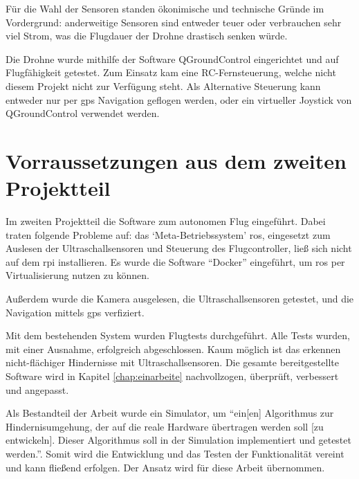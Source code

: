 Für die Wahl der Sensoren standen ökonimische und technische Gründe im Vordergrund: anderweitige Sensoren sind entweder teuer oder verbrauchen sehr viel Strom, was die Flugdauer der Drohne drastisch senken würde\cite[Kapitel 4.3.8]{wirthErweiterungBestehendenDrohne2022}.

Die Drohne wurde mithilfe der Software QGroundControl eingerichtet\cite[Kapitel 4.3.5]{wirthErweiterungBestehendenDrohne2022} und auf Flugfähigkeit getestet\cite[Kapitel 4.3.7]{wirthErweiterungBestehendenDrohne2022}. Zum Einsatz kam eine RC-Fernsteuerung, welche nicht diesem Projekt nicht zur Verfügung steht. Als Alternative Steuerung kann entweder nur per \gls{gps} Navigation geflogen werden, oder ein virtueller Joystick von QGroundControl verwendet werden.

\section{Vorraussetzungen aus dem zweiten Projektteil}
Im zweiten Projektteil \cite{wirthErweiterungBestehendenDrohne2022a} die Software zum autonomen Flug eingeführt. Dabei traten folgende Probleme auf: das \enquote*{Meta-Betriebssystem} \gls{ros}, eingesetzt zum Auslesen der Ultraschallsensoren und Steuerung des Flugcontroller, ließ sich nicht auf dem \gls{rpi} installieren. Es wurde die Software \enquote{Docker} eingeführt, um \gls{ros} per Virtualisierung nutzen zu können\cite[Kapitel 6.5]{wirthErweiterungBestehendenDrohne2022a}.

Außerdem wurde die Kamera\cite[Kapitel 6.8]{wirthErweiterungBestehendenDrohne2022a} ausgelesen, die Ultraschallsensoren getestet\cite[Kapitel 6.9]{wirthErweiterungBestehendenDrohne2022a}, und die Navigation mittels \gls{gps} verfiziert\cite[Kapitel 6.10]{wirthErweiterungBestehendenDrohne2022a}.

Mit dem bestehenden System wurden Flugtests durchgeführt. Alle Tests wurden, mit einer Ausnahme, erfolgreich abgeschlossen. Kaum möglich ist das erkennen nicht-flächiger Hindernisse mit Ultraschallsensoren\cite[Kapitel 6.10]{wirthErweiterungBestehendenDrohne2022a}. Die gesamte bereitgestellte Software wird in Kapitel \cref{chap:einarbeite} nachvollzogen, überprüft, verbessert und angepasst.

Als Bestandteil der Arbeit wurde ein Simulator, um \enquote{ein[en] Algorithmus zur Hindernisumgehung, der auf die reale Hardware übertragen werden soll [zu entwickeln]. Dieser Algorithmus soll in der Simulation implementiert und getestet werden.}\cite[Kapitel 8]{wirthErweiterungBestehendenDrohne2022a}. Somit wird die Entwicklung und das Testen der Funktionalität vereint und kann fließend erfolgen. Der Ansatz wird für diese Arbeit übernommen. 


